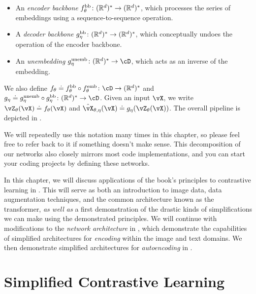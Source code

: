 \documentclass[../../book-main.tex]{subfiles}
\begin{document}
\begin{itemize}
\begin{itemize}
        \item An \textit{encoder backbone} \(f_{\theta}^{\mathrm{bb}} \colon (\mathbb{R}^{d})^{*} \to (\mathbb{R}^{d})^{*}\), which processes the series of embeddings using a sequence-to-sequence operation.
        \item A \textit{decoder backbone} \(g_{\eta}^{\mathrm{bb}} \colon (\mathbb{R}^{d})^{*} \to (\mathbb{R}^{d})^{*}\), which conceptually undoes the operation of the encoder backbone.
        \item An \textit{unembedding} \(g_{\eta}^{\unemb} \colon (\R^{d})^{*} \to \cD\), which acts as an inverse of the embedding.
    \end{itemize}
    We also define \(f_{\theta} \doteq f_{\theta}^{\backbone} \circ f_{\theta}^{\emb} \colon \cD \to (\R^{d})^{*}\) and \(g_{\eta} \doteq g_{\eta}^{\unemb} \circ g_{\eta}^{\backbone} \colon (\R^{d})^{*} \to \cD\). Given an input \(\vX\), we write \(\vZ_{\theta}(\vX) \doteq f_{\theta}(\vX)\) and \(\hat{\vX}_{\theta, \eta}(\vX) \doteq g_{\eta}(\vZ_{\theta}(\vX))\). The overall pipeline is depicted in .
\end{itemize}

We will repeatedly use this notation many times in this chapter, so please feel free to refer back to it if something doesn't make sense. This decomposition of our networks also closely mirrors most code implementations, and you can start your coding projects by defining these networks.

In this chapter, we will discuss applications of the book's principles to contrastive learning in . This will serve as both an introduction to image data, data augmentation techniques, and the common architecture known as the transformer, \textit{as well as} a first demonstration of the drastic kinds of simplifications we can make using the demonstrated principles. We will continue with modifications to the \textit{network architecture} in , which demonstrate the capabilities of simplified architectures for \textit{encoding} within the image and text domains. We then demonstrate simplified architectures for \textit{autoencoding} in . %


\section{Simplified Contrastive Learning}\label{sec:contrastive_learning}
\end{document}
